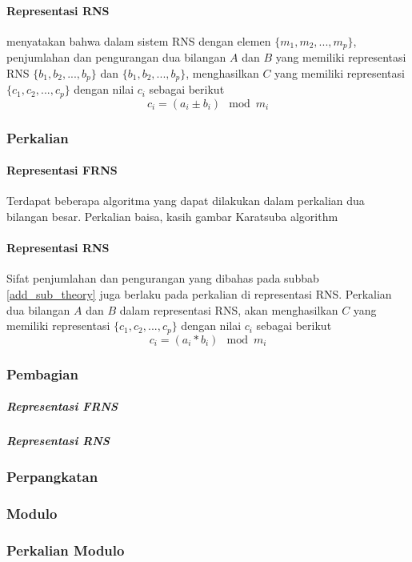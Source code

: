 
\paragraph{Representasi RNS}

\citet{rns_sharoun} menyatakan bahwa dalam sistem RNS dengan elemen $\{m_1,m_2,...,m_p\}$, penjumlahan dan pengurangan dua bilangan $A$ dan $B$ yang memiliki representasi RNS $\{b_1,b_2,...,b_p\}$ dan $\{b_1,b_2,...,b_p\}$,  menghasilkan $C$ yang memiliki representasi $\{c_1,c_2,...,c_p\}$ dengan nilai $c_i$ sebagai berikut
\begin{equation}
    c_i = (a_i \pm b_i) \mod m_i
\end{equation}


\subsubsection{Perkalian}

\paragraph{Representasi FRNS}
Terdapat beberapa algoritma yang dapat dilakukan dalam perkalian dua bilangan besar.
Perkalian baisa, kasih gambar
Karatsuba algorithm


\paragraph{Representasi RNS}
Sifat penjumlahan dan pengurangan yang dibahas pada subbab \ref{add_sub_theory} juga berlaku pada perkalian di representasi RNS. Perkalian dua bilangan $A$ dan $B$ dalam representasi RNS, akan menghasilkan $C$ yang memiliki representasi $\{c_1,c_2,...,c_p\}$ dengan nilai $c_i$ sebagai berikut
\begin{equation}
    c_i = (a_i * b_i) \mod m_i
\end{equation}

\subsubsection{Pembagian}

\subparagraph{Representasi FRNS}

\subparagraph{Representasi RNS}

\subsubsection{Perpangkatan}
\subsubsection{Modulo}
\subsubsection{Perkalian Modulo} \label{mod_mul_theory}
